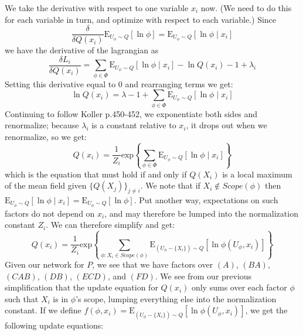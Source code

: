 \documentclass[12pt]{article}
\begin{document}
We take the derivative with respect to one variable $x_i$ now. (We need to do this for each variable in turn, and optimize with respect to each variable.)  Since
\begin{equation*}
\frac{\delta }{\delta Q(x_i)} \mathrm{E}_{U_\phi \sim Q} [\ln \phi] = \mathrm{E}_{U_\phi \sim Q} [\ln \phi \mid x_i]
\end{equation*}
we have the derivative of the lagrangian as
\begin{equation*}
\frac{\delta L_i }{\delta Q(x_i)} = \sum_{\phi \in \Phi} \mathrm{E}_{U_\phi \sim Q} [\ln \phi \mid x_i] - \ln Q(x_i) - 1 + \lambda_i
\end{equation*}
Setting this derivative equal to 0 and rearranging terms we get:
\begin{equation*}
\ln Q(x_i) = \lambda - 1 + \sum_{\phi \in \Phi} \mathrm{E}_{U_\phi \sim Q} [\ln \phi \mid x_i]
\end{equation*}
Continuing to follow Koller p.450-452, we exponentiate both sides and renormalize; because $\lambda_i$ is a constant relative to $x_i$, it drops out when we renormalize, so we get:
\begin{equation*}
Q(x_i) = \frac{1}{Z_i} \mathrm{exp} \left\lbrace \sum_{\phi \in \Phi} \mathrm{E}_{U_\phi \sim Q} [\ln \phi \mid x_i] \right\rbrace
\end{equation*}
which is the equation that must hold if and only if $Q(X_i)$ is a local maximum of the mean field given $\lbrace Q(X_j) \rbrace_{j \not = i}$.  We note that if $X_i \not \in Scope(\phi)$ then $\mathrm{E}_{U_\phi \sim Q} [\ln \phi \mid x_i] = \mathrm{E}_{U_\phi \sim Q} [\ln \phi]$.  Put another way, expectations on such factors do not depend on $x_i$, and may therefore be lumped into the normalization constant $Z_i$.  We can therefore simplify and get:
\begin{equation*}
Q(x_i) = \frac{1}{Z_i} \mathrm{exp} \left\lbrace \sum_{\phi : X_i \in Scope(\phi)} \mathrm{E}_{(U_\phi - \lbrace X_i \rbrace) \sim Q} [\ln \phi(U_\phi , x_i)] \right\rbrace
\end{equation*}
Given our network for $P$, we see that we have factors over $(A)$, $(BA)$, $(CAB)$, $(DB)$, $(ECD)$, and $(FD)$.  We see from our previous simplification that the update equation for $Q(x_i)$ only sums over each factor $\phi$ such that $X_i$ is in $\phi$'s scope, lumping everything else into the normalization constant.  If we define $f(\phi, x_i) = \mathrm{E}_{(U_\phi - \lbrace X_i \rbrace) \sim Q} [\ln \phi(U_\phi , x_i)]$, we get the following update equations:
\end{document}
